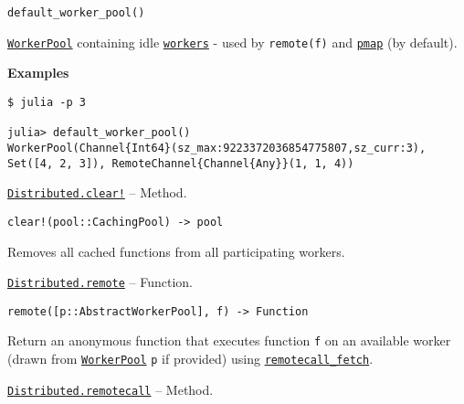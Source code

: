 \begin{adjustwidth}{2em}{0pt}


\begin{verbatim}
default_worker_pool()
\end{verbatim}

\hyperlink{17976394752057970100}{\texttt{WorkerPool}} containing idle \hyperlink{7474509137601932173}{\texttt{workers}} - used by \texttt{remote(f)} and \hyperlink{9432281416771383761}{\texttt{pmap}} (by default).

\textbf{Examples}


\begin{verbatim}
$ julia -p 3

julia> default_worker_pool()
WorkerPool(Channel{Int64}(sz_max:9223372036854775807,sz_curr:3), Set([4, 2, 3]), RemoteChannel{Channel{Any}}(1, 1, 4))
\end{verbatim}



\end{adjustwidth}
\hypertarget{16881245113854963094}{}
\hyperlink{16881245113854963094}{\texttt{Distributed.clear!}}  -- {Method.}

\begin{adjustwidth}{2em}{0pt}


\begin{verbatim}
clear!(pool::CachingPool) -> pool
\end{verbatim}

Removes all cached functions from all participating workers.



\end{adjustwidth}
\hypertarget{11837735656545549689}{}
\hyperlink{11837735656545549689}{\texttt{Distributed.remote}}  -- {Function.}

\begin{adjustwidth}{2em}{0pt}


\begin{verbatim}
remote([p::AbstractWorkerPool], f) -> Function
\end{verbatim}

Return an anonymous function that executes function \texttt{f} on an available worker (drawn from \hyperlink{17976394752057970100}{\texttt{WorkerPool}} \texttt{p} if provided) using \hyperlink{17262349333771600150}{\texttt{remotecall\_fetch}}.



\end{adjustwidth}
\hypertarget{2353434528977144589}{}
\hyperlink{2353434528977144589}{\texttt{Distributed.remotecall}}  -- {Method.}


